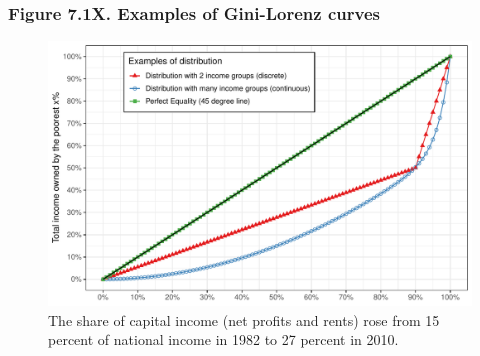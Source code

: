 \documentclass[t]{beamer}\usepackage[]{graphicx}\usepackage[]{color}
\newenvironment{knitrout}{}{} %
\begin{document}
\begin{frame}[label=Figure_7_1X]
\frametitle{Figure 7.1X. Examples of Gini-Lorenz curves}
\begin{figure}[t]
\begin{minipage}[b]{\textwidth}
\centering
\begin{knitrout}\footnotesize
{}\color{fgcolor}

{\centering \includegraphics[width=1\linewidth]{figures/color/Figure_7_1X} 

}



\end{knitrout}
\caption{The share of capital income (net profits and rents) rose from 15 percent of national income in 1982 to 27 percent in 2010.}
\end{minipage}
\end{figure}
\end{frame}
\end{document}

